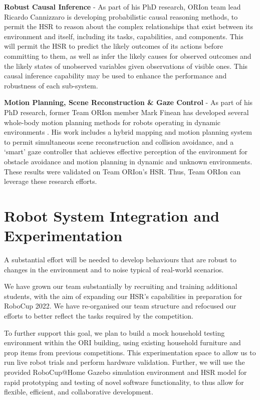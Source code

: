 \documentclass[runningheads,a4paper]{llncs}
\newcommand{\teamori}{Team ORIon}
\newcommand{\competitionyear}{2022}
\newcommand{\robocuptitleshort}{RoboCup \competitionyear}
\begin{document}
\textbf{Robust Causal Inference} - As part of his PhD research, ORIon team lead Ricardo Cannizzaro is developing probabilistic causal reasoning methods, to permit the HSR to reason about the complex relationships that exist between its environment and itself, including its tasks, capabilities, and components. This will permit the HSR to predict the likely outcomes of its actions before committing to them, as well as infer the likely causes for observed outcomes and the likely states of unobserved variables given observations of visible ones. This causal inference capability may be used to enhance the performance and robustness of each sub-system.

\textbf{Motion Planning, Scene Reconstruction \& Gaze Control} - As part of his PhD research, former \teamori{} member Mark Finean has developed several whole-body motion planning methods for robots operating in dynamic environments \cite{finean2021simultaneous,finean2021i}. His work includes a hybrid mapping and motion planning system to permit simultaneous scene reconstruction and collision avoidance, and a `smart' gaze controller that achieves effective perception of the environment for obstacle avoidance and motion planning in dynamic and unknown environments. These results were validated on \teamori{}'s HSR. Thus, \teamori{} can leverage these research efforts.

\section{Robot System Integration and Experimentation}
A substantial effort will be needed to develop behaviours that are robust to
changes in the environment and to noise typical of real-world scenarios.

We have grown our team substantially by recruiting and training additional students, with the aim of expanding our HSR's capabilities in preparation for \robocuptitleshort{}. We have re-organised our team structure and refocused our efforts to better reflect the tasks required by the competition.

To further support this goal, we plan to build a mock household testing environment within the ORI building, using existing household furniture and prop items from previous competitions. This experimentation space to allow us to run live robot trials and perform hardware validation. Further, we will use the provided RoboCup@Home Gazebo simulation environment and HSR model for rapid prototyping and testing of novel software functionality, to thus allow for flexible, efficient, and collaborative development.
\end{document}
